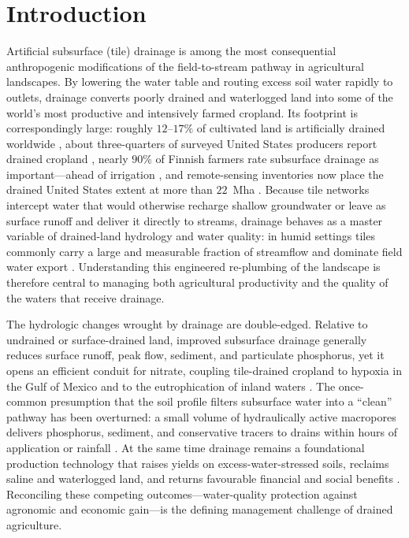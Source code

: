 \documentclass[11pt]{article}
\begin{document}
\section*{Introduction}

Artificial subsurface (tile) drainage is among the most consequential
anthropogenic modifications of the field-to-stream pathway in agricultural
landscapes. By lowering the water table and routing excess soil water rapidly
to outlets, drainage converts poorly drained and waterlogged land into some of
the world's most productive and intensively farmed cropland. Its footprint is
correspondingly large: roughly $12$--$17\%$ of cultivated land is artificially
drained worldwide \parencite{Valipour2014}, about three-quarters of surveyed
United States producers report drained cropland \parencite{Morton2015}, nearly
$90\%$ of Finnish farmers rate subsurface drainage as important---ahead of
irrigation \parencite{PeltonenSainio2021}, and remote-sensing inventories now
place the drained United States extent at more than $22$~Mha
\parencite{Valayamkunnath2020}. Because tile networks intercept water that would
otherwise recharge shallow groundwater or leave as surface runoff and deliver it
directly to streams, drainage behaves as a master variable of drained-land
hydrology and water quality: in humid settings tiles commonly carry a large and
measurable fraction of streamflow and dominate field water export
\parencite{King2014,Williams2018,Schilling2019}. Understanding this engineered
re-plumbing of the landscape is therefore central to managing both agricultural
productivity and the quality of the waters that receive drainage.

The hydrologic changes wrought by drainage are double-edged. Relative to
undrained or surface-drained land, improved subsurface drainage generally
reduces surface runoff, peak flow, sediment, and particulate phosphorus, yet it
opens an efficient conduit for nitrate, coupling tile-drained cropland to
hypoxia in the Gulf of Mexico and to the eutrophication of inland waters
\parencite{FAUSEY1995,SKAGGS1994,THOMAS1995,Gramlich2018,Raymond2012}. The
once-common presumption that the soil profile filters subsurface water into a
``clean'' pathway has been overturned: a small volume of hydraulically active
macropores delivers phosphorus, sediment, and conservative tracers to drains
within hours of application or rainfall \parencite{Pease2018}. At the
same time drainage remains a foundational production technology that raises
yields on excess-water-stressed soils, reclaims saline and waterlogged land, and
returns favourable financial and social benefits \parencite{Singh2022b,Yang2025}.
Reconciling these competing outcomes---water-quality protection against
agronomic and economic gain---is the defining management challenge of drained
agriculture.
\end{document}
